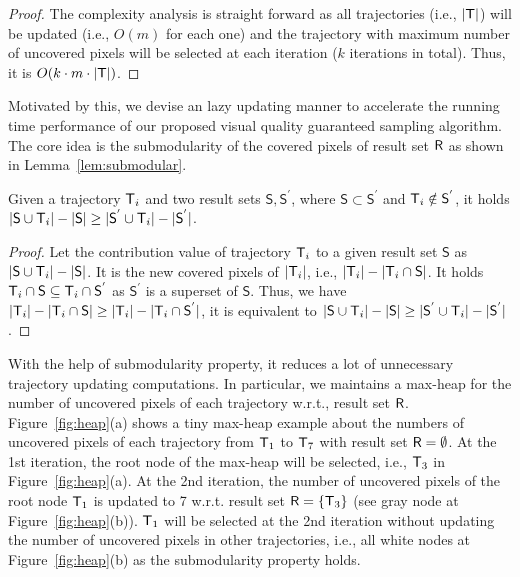 \begin{proof}
The complexity analysis is straight forward as all trajectories (i.e., $|\mathsf{T}|$) will be updated (i.e., $O(m)$ for each one) and the trajectory with maximum number of uncovered pixels will be selected at each iteration ($k$ iterations in total). Thus, it is  $O(k \cdot m \cdot |\mathsf{T}|)$.
\end{proof}

Motivated by this, we devise an lazy updating manner to accelerate the running time performance of our proposed visual quality guaranteed sampling algorithm.
The core idea is the submodularity of the covered pixels of result set $\mathsf{R}$ as shown in Lemma~\ref{lem:submodular}.

\begin{lemma}[Submodularity]\label{lem:submodular}
Given a trajectory $\mathsf{T}_i$ and two result sets $\mathsf{S},\mathsf{S}^{'}$, where $\mathsf{S} \subset \mathsf{S}^{'}$ and $\mathsf{T}_i \notin \mathsf{S}^{'}$,
it holds $|\mathsf{S} \cup \mathsf{T}_i| - |\mathsf{S}| \geq |\mathsf{S}^{'} \cup \mathsf{T}_i| - |\mathsf{S}^{'}|$.
\end{lemma}

\begin{proof}
Let the contribution value of trajectory $\mathsf{T}_i$ to a given result set $\mathsf{S}$ as $|\mathsf{S} \cup \mathsf{T}_i| - |\mathsf{S}|$.
It is the new covered pixels of $|\mathsf{T}_i|$, i.e., $|\mathsf{T}_i| - |\mathsf{T}_i \cap \mathsf{S}|$.
It holds $\mathsf{T}_i \cap \mathsf{S} \subseteq  \mathsf{T}_i \cap \mathsf{S}^{'}$ as $\mathsf{S}^{'}$ is a superset of $\mathsf{S}$.
Thus, we have $|\mathsf{T}_i| - |\mathsf{T}_i \cap \mathsf{S}| \geq |\mathsf{T}_i| - |\mathsf{T}_i \cap \mathsf{S}^{'}|$,
it is equivalent to $|\mathsf{S} \cup \mathsf{T}_i| - |\mathsf{S}| \geq |\mathsf{S}^{'} \cup \mathsf{T}_i| - |\mathsf{S}^{'}|$.
\end{proof}

With the help of submodularity property, it reduces a lot of unnecessary trajectory updating computations.
In particular, we maintains a max-heap for the number of uncovered pixels of each trajectory w.r.t., result set $\mathsf{R}$.
Figure~\ref{fig:heap}(a) shows a tiny max-heap example about the numbers of uncovered pixels of each trajectory from $\mathsf{T}_1$ to $\mathsf{T}_7$ with result set $\mathsf{R}=\emptyset$.
At the 1st iteration, the root node of the max-heap will be selected, i.e., $\mathsf{T}_3$ in Figure~\ref{fig:heap}(a).
At the 2nd iteration, the number of uncovered pixels of the root node $\mathsf{T}_1$ is updated to 7 w.r.t. result set $\mathsf{R} = \{\mathsf{T}_3 \}$ (see gray node at Figure~\ref{fig:heap}(b)).
$\mathsf{T}_1$ will be selected at the 2nd iteration without updating the number of uncovered pixels in other trajectories, i.e., all white nodes at Figure~\ref{fig:heap}(b) as the submodularity property holds.

